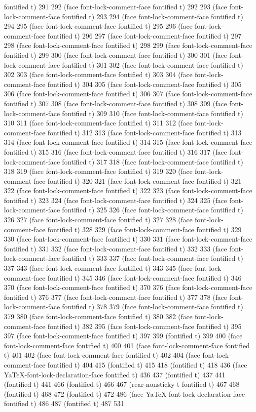 fontified t) 291 292 (face font-lock-comment-face fontified t) 292 293 (face font-lock-comment-face fontified t) 293 294 (face font-lock-comment-face fontified t) 294 295 (face font-lock-comment-face fontified t) 295 296 (face font-lock-comment-face fontified t) 296 297 (face font-lock-comment-face fontified t) 297 298 (face font-lock-comment-face fontified t) 298 299 (face font-lock-comment-face fontified t) 299 300 (face font-lock-comment-face fontified t) 300 301 (face font-lock-comment-face fontified t) 301 302 (face font-lock-comment-face fontified t) 302 303 (face font-lock-comment-face fontified t) 303 304 (face font-lock-comment-face fontified t) 304 305 (face font-lock-comment-face fontified t) 305 306 (face font-lock-comment-face fontified t) 306 307 (face font-lock-comment-face fontified t) 307 308 (face font-lock-comment-face fontified t) 308 309 (face font-lock-comment-face fontified t) 309 310 (face font-lock-comment-face fontified t) 310 311 (face font-lock-comment-face fontified t) 311 312 (face font-lock-comment-face fontified t) 312 313 (face font-lock-comment-face fontified t) 313 314 (face font-lock-comment-face fontified t) 314 315 (face font-lock-comment-face fontified t) 315 316 (face font-lock-comment-face fontified t) 316 317 (face font-lock-comment-face fontified t) 317 318 (face font-lock-comment-face fontified t) 318 319 (face font-lock-comment-face fontified t) 319 320 (face font-lock-comment-face fontified t) 320 321 (face font-lock-comment-face fontified t) 321 322 (face font-lock-comment-face fontified t) 322 323 (face font-lock-comment-face fontified t) 323 324 (face font-lock-comment-face fontified t) 324 325 (face font-lock-comment-face fontified t) 325 326 (face font-lock-comment-face fontified t) 326 327 (face font-lock-comment-face fontified t) 327 328 (face font-lock-comment-face fontified t) 328 329 (face font-lock-comment-face fontified t) 329 330 (face font-lock-comment-face fontified t) 330 331 (face font-lock-comment-face fontified t) 331 332 (face font-lock-comment-face fontified t) 332 333 (face font-lock-comment-face fontified t) 333 337 (face font-lock-comment-face fontified t) 337 343 (face font-lock-comment-face fontified t) 343 345 (face font-lock-comment-face fontified t) 345 346 (face font-lock-comment-face fontified t) 346 370 (face font-lock-comment-face fontified t) 370 376 (face font-lock-comment-face fontified t) 376 377 (face font-lock-comment-face fontified t) 377 378 (face font-lock-comment-face fontified t) 378 379 (face font-lock-comment-face fontified t) 379 380 (face font-lock-comment-face fontified t) 380 382 (face font-lock-comment-face fontified t) 382 395 (face font-lock-comment-face fontified t) 395 397 (face font-lock-comment-face fontified t) 397 399 (fontified t) 399 400 (face font-lock-comment-face fontified t) 400 401 (face font-lock-comment-face fontified t) 401 402 (face font-lock-comment-face fontified t) 402 404 (face font-lock-comment-face fontified t) 404 415 (fontified t) 415 418 (fontified t) 418 436 (face YaTeX-font-lock-declaration-face fontified t) 436 437 (fontified t) 437 441 (fontified t) 441 466 (fontified t) 466 467 (rear-nonsticky t fontified t) 467 468 (fontified t) 468 472 (fontified t) 472 486 (face YaTeX-font-lock-declaration-face fontified t) 486 487 (fontified t) 487 531 